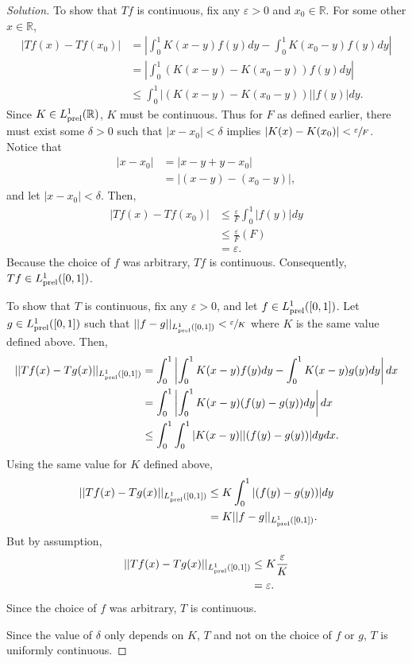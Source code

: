 \documentclass[11pt,letterpaper]{article}
\newcommand{\R}{\mathbb{R}}
\newcommand{\eps}{\varepsilon}
\renewcommand{\epsilon}{\eps}
\newcommand{\prel}{{\rm prel}}
\newenvironment{solution}
  {\renewcommand\qedsymbol{}\begin{proof}[Solution]}
  {\end{proof}\bigskip}
\begin{document}
\begin{solution}
 	To show that $Tf$ is continuous, fix any $\epsilon > 0$ and $x_0 \in \R$. For some other $x\in \R$,
 	\[\begin{split}
 		|Tf(x)-Tf(x_0)| &= \left | \int_{0}^{1} K(x-y)f(y)dy - \int_{0}^{1} K(x_0-y)f(y)dy \right |\\
 		& = \left | \int_{0}^{1} \left (K(x-y) - K(x_0-y) \right ) f(y) dy \right |\\
 		&\leq \int_{0}^{1} \left | \left (K(x-y) - K(x_0-y) \right ) \right | |f(y)| dy.
 	\end{split}\]
 	Since $K \in L_\prel^1(\R)$, $K$ must be continuous. Thus for $F$ as defined earlier, there must exist some $\delta > 0$ such that $|x-x_0| < \delta$ implies $|K(x) - K(x_0)| < \sfrac{\epsilon}{F}$. Notice that
 	\[\begin{split}
 		|x-x_0| &= |x - y + y - x_0|\\
 		&= |(x - y) - (x_0-y)|,
 	\end{split}\] and let $|x-x_0| < \delta$. Then,
 	\[\begin{split}
 		|Tf(x)-Tf(x_0)| &\leq \frac{\epsilon}{F} \int_{0}^{1}  |f(y)| dy\\
 		&\leq \frac{\epsilon}{F} (F)\\
 		& = \epsilon.
 	\end{split}\]
 	Because the choice of $f$ was arbitrary, $Tf$ is continuous. Consequently, $Tf \in L_\prel^1([0,1])$.
 	
 	To show that $T$ is continuous, fix any $\epsilon > 0$, and let $f\in L_{\rm prel}^1([0,1])$. Let $g\in L_{\rm prel}^1([0,1])$ such that $||f-g||_{L_\prel^1([0,1])} < \sfrac{\epsilon}{K}$ where $K$ is the same value defined above. Then,
 	\[\begin{split}
 		||Tf(x)-Tg(x)||_{L_\prel^1([0,1])} &= \int_{0}^{1} \left | \int_{0}^{1} K(x-y)f(y)dy - \int_{0}^{1} K(x-y)g(y)dy \right | dx \\
 		&= \int_{0}^{1} \left | \int_{0}^{1} K(x-y)(f(y) - g(y) ) dy \right | dx \\
 		&\leq \int_{0}^{1} \int_{0}^{1} |K(x-y)||(f(y) - g(y))| dy dx.
 	\end{split}\]
 	Using the same value for $K$ defined above,
 	\[\begin{split}
 		||Tf(x)-Tg(x)||_{L_\prel^1([0,1])} &\leq K \int_{0}^{1}|(f(y) - g(y))| dy\\
 		&= K ||f-g||_{L_\prel^1([0,1])}.
	\end{split}\]
	But by assumption,
	\[\begin{split}
		||Tf(x)-Tg(x)||_{L_\prel^1([0,1])} &\leq K \frac{\epsilon}{K}\\
		&= \epsilon.
	\end{split}\]
	Since the choice of $f$ was arbitrary, $T$ is continuous.
	
	Since the value of $\delta$ only depends on $K$, $T$ and not on the choice of $f$ or $g$, $T$ is uniformly continuous.
\end{solution}
\newpage
\end{document}
